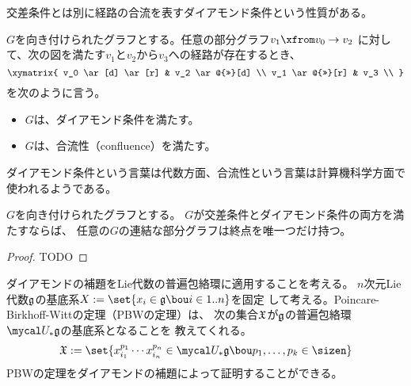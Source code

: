 {	交差条件とは別に経路の合流を表すダイアモンド条件という性質がある。

	\begin{definition}[ダイアモンド条件]\label{def:ダイアモンド条件} %
		$G$を向き付けられたグラフとする。任意の部分グラフ$v_1\from v_0\to v_2$
		に対して、次の図を満たす$v_1$と$v_2$から$v_3$への経路が存在するとき、
		\begin{equation*}\xymatrix{
			v_0 \ar[d] \ar[r] & v_2 \ar@{>>}[d] \\
			v_1 \ar@{>>}[r] & v_3 \\
		}\end{equation*}
		を次のように言う。
		\begin{itemize}\setlength{\itemsep}{-1mm} %
			\item $G$は、ダイアモンド条件を満たす。
			\item $G$は、合流性（confluence）を満たす。
		\end{itemize} %
	\end{definition} %

	ダイアモンド条件という言葉は代数方面、合流性という言葉は計算機科学方面で
	使われるようである。

	\begin{proposition}[ダイアモンドの補題]\label{prop:ダイアモンドの補題} %
		$G$を向き付けられたグラフとする。
		$G$が交差条件とダイアモンド条件の両方を満たすならば、
		任意の$G$の連結な部分グラフは終点を唯一つだけ持つ。
	\end{proposition} %
	\begin{proof} TODO
	\end{proof}

	ダイアモンドの補題をLie代数の普遍包絡環に適用することを考える。
	$n$次元Lie代数${\mathfrak{g}}$の基底系$X:=\set{x_i\in\mf{g}\bou i\in1..n}$を固定
	して考える。Poincare-Birkhoff-Wittの定理（PBWの定理）は、
	次の集合${\mathfrak{X}}$が${\mathfrak{g}}$の普遍包絡環$\U_*\mf{g}$の基底系となることを
	教えてくれる。
	\begin{equation*}\begin{split}
		\mf{X} := \set{x_{i_1}^{p_1}\cdots x_{i_n}^{p_n}\in\U_*\mf{g}
			\bou p_1,\dots,p_k\in\sizen} \\
	\end{split}\end{equation*}
	PBWの定理をダイアモンドの補題によって証明することができる。

}
